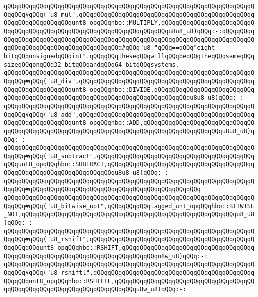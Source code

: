 \verb|qQQqqQQqqQQqqQQqqQQqqQQqqQQqqQQqqQQqqQQqqQQqqQQqqQQqqQQqqQQqqQQqqQQqqQQqqQQq#qQQq("u8_mul",qQQqqQQqqQQqqQQqqQQqqQQqqQQqqQQqqQQqqQQqqQQqqQQqqQQqqQQqqQQqqQQqqQQqunt8_opqQQqhbo::MULTIPLY,qQQqqQQqqQQqqQQqqQQqqQQqqQQqqQQqqQQqqQQqqQQqqQQqqQQqqQQqqQQqqQQqqQQqqQQqu8u8_u8)qQQq:-:qQQqqQQqqQQqqQQqqQQqqQQqqQQqqQQqqQQqqQQqqQQqqQQqqQQqqQQqqQQqqQQqqQQqqQQqqQQqqQQqqQQqqQQqqQQqqQQqqQQqqQQqqQQqqQQq#qQQq"u8_"qQQq==qQQq"eight-bitqQQqunsignedqQQqint".qQQqqQQqTheseqQQqwillqQQqbeqQQqtheqQQqsameqQQqsizeqQQqonqQQq32-bitqQQqandqQQq64-bitqQQqsystems.|\newline
\verb|qQQqqQQqqQQqqQQqqQQqqQQqqQQqqQQqqQQqqQQqqQQqqQQqqQQqqQQqqQQqqQQqqQQqqQQqqQQq#qQQq("u8_div",qQQqqQQqqQQqqQQqqQQqqQQqqQQqqQQqqQQqqQQqqQQqqQQqqQQqqQQqqQQqqQQqqQQqunt8_opqQQqhbo::DIVIDE,qQQqqQQqqQQqqQQqqQQqqQQqqQQqqQQqqQQqqQQqqQQqqQQqqQQqqQQqqQQqqQQqqQQqqQQqqQQqqQQqu8u8_u8)qQQq:-:|\newline
\verb|qQQqqQQqqQQqqQQqqQQqqQQqqQQqqQQqqQQqqQQqqQQqqQQqqQQqqQQqqQQqqQQqqQQqqQQqqQQq#qQQq("u8_add",qQQqqQQqqQQqqQQqqQQqqQQqqQQqqQQqqQQqqQQqqQQqqQQqqQQqqQQqqQQqqQQqqQQqunt8_opqQQqhbo::ADD,qQQqqQQqqQQqqQQqqQQqqQQqqQQqqQQqqQQqqQQqqQQqqQQqqQQqqQQqqQQqqQQqqQQqqQQqqQQqqQQqqQQqqQQqqQQqu8u8_u8)qQQq:-:|\newline
\verb|qQQqqQQqqQQqqQQqqQQqqQQqqQQqqQQqqQQqqQQqqQQqqQQqqQQqqQQqqQQqqQQqqQQqqQQqqQQq#qQQq("u8_subtract",qQQqqQQqqQQqqQQqqQQqqQQqqQQqqQQqqQQqqQQqqQQqqQQqunt8_opqQQqhbo::SUBTRACT,qQQqqQQqqQQqqQQqqQQqqQQqqQQqqQQqqQQqqQQqqQQqqQQqqQQqqQQqqQQqqQQqqQQqqQQqu8u8_u8)qQQq:-:|\newline
\verb|qQQqqQQqqQQqqQQqqQQqqQQqqQQqqQQqqQQqqQQqqQQqqQQqqQQqqQQqqQQqqQQqqQQqqQQqqQQq#qQQqqQQqqQQqqQQqqQQqqQQqqQQqqQQqqQQqqQQqqQQqqQQq|\newline
\verb|qQQqqQQqqQQqqQQqqQQqqQQqqQQqqQQqqQQqqQQqqQQqqQQqqQQqqQQqqQQqqQQqqQQqqQQqqQQq#qQQq("u8_bitwise_not",qQQqqQQqqQQqtagged_unt_opqQQqhbo::BITWISE_NOT,qQQqqQQqqQQqqQQqqQQqqQQqqQQqqQQqqQQqqQQqqQQqqQQqqQQqqQQqqQQqu8_u8)qQQq:-:|\newline
\verb|qQQqqQQqqQQqqQQqqQQqqQQqqQQqqQQqqQQqqQQqqQQqqQQqqQQqqQQqqQQqqQQqqQQqqQQqqQQq#qQQq("u8_rshift",qQQqqQQqqQQqqQQqqQQqqQQqqQQqqQQqqQQqqQQqqQQqqQQqqQQqqQQqunt8_opqQQqhbo::RSHIFT,qQQqqQQqqQQqqQQqqQQqqQQqqQQqqQQqqQQqqQQqqQQqqQQqqQQqqQQqqQQqqQQqqQQqqQQqqQQqqQQqu8w_u8)qQQq:-:|\newline
\verb|qQQqqQQqqQQqqQQqqQQqqQQqqQQqqQQqqQQqqQQqqQQqqQQqqQQqqQQqqQQqqQQqqQQqqQQqqQQq#qQQq("u8_rshiftl",qQQqqQQqqQQqqQQqqQQqqQQqqQQqqQQqqQQqqQQqqQQqqQQqqQQqunt8_opqQQqhbo::RSHIFTL,qQQqqQQqqQQqqQQqqQQqqQQqqQQqqQQqqQQqqQQqqQQqqQQqqQQqqQQqqQQqqQQqqQQqqQQqqQQqu8w_u8)qQQq:-:|\newline
